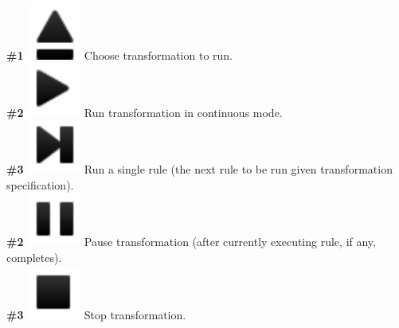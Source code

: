 \documentclass{article}
\numberwithin{equation}{section}
\numberwithin{figure}{section}
\begin{document}
\textbf{\#1} \hspace*{1cm}
\includegraphics[scale=0.5]{figures/icon_load} \hspace*{1cm}
Choose transformation to run.\\

\textbf{\#2} \hspace*{1cm}
\includegraphics[scale=0.5]{figures/icon_play} \hspace*{1cm}
Run transformation in continuous mode.\\

\textbf{\#3} \hspace*{1cm}
\includegraphics[scale=0.5]{figures/icon_step} \hspace*{1cm}
Run a single rule (the next rule to be run given transformation specification).\\

\textbf{\#2} \hspace*{1cm}
\includegraphics[scale=0.5]{figures/icon_pause} \hspace*{1cm}
Pause transformation (after currently executing rule, if any, completes).\\

\textbf{\#3} \hspace*{1cm}
\includegraphics[scale=0.5]{figures/icon_stop} \hspace*{1cm}
Stop transformation.\\
\end{document}
